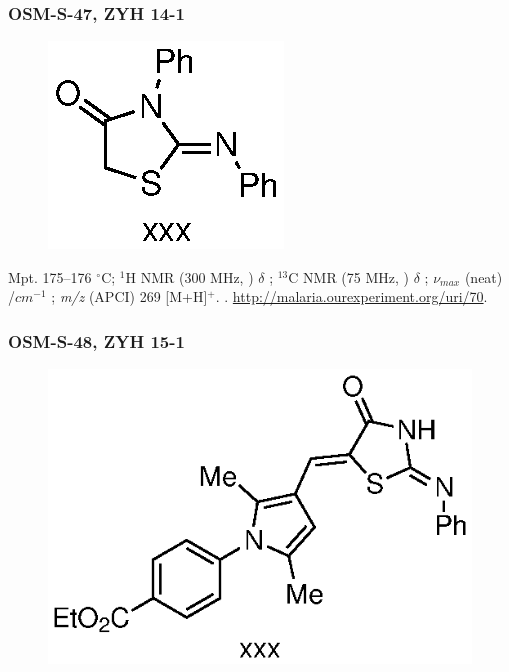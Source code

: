 \documentclass[12pt, a4paper,titlepage]{article}
\begin{document}
{\subsubsection*{OSM-S-47, ZYH 14-1}
\label{exp:ZYH14}
	\begin{figure}[H]
	\begin{center}
	\includegraphics{exp/ZYH14.eps}
	\end{center}
	\vspace{-25pt}	
	\end{figure}

Mpt. 175--176 $^\circ$C; 
$^1$H NMR (300 MHz, ) $\delta$ ; 
  $^{13}$C NMR (75 MHz, ) $\delta$ ; 
 $\nu_{max}$ (neat) /$cm^{-1}$ ; 
\emph{m/z} (APCI) 269 [M+H]$^+$.
. 
\url{http://malaria.ourexperiment.org/uri/70}. 

\subsubsection*{OSM-S-48, ZYH 15-1}
\label{exp:ZYH15}
	\begin{figure}[H]
	\begin{center}
	\includegraphics{exp/ZYH15.eps}
	\end{center}
	\vspace{-25pt}	
	\end{figure}

}
\end{document}

